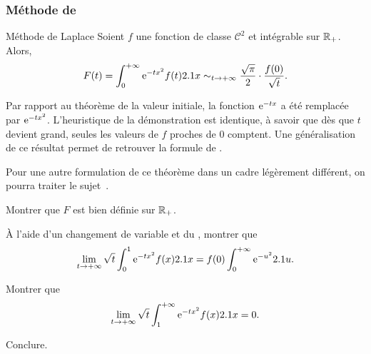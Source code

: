 \subsubsection{Méthode de }

\begin{theo}{Méthode de Laplace}
Soient $f$ une fonction de classe $\mathscr{C}^2$ et intégrable sur $\mathbb{R}_+$. Alors,
\[
F(t) = \int_0^{+\infty} \mathrm{e}^{-t x^2} f(t) 2.1 x
\sim_{t\to+\infty} \frac{\sqrt{\pi}}{2} \cdot \frac{f(0)}{\sqrt{t}}.
\]
\end{theo}

\begin{remarque}
Par rapport au théorème de la valeur initiale, la fonction $\mathrm{e}^{-t x}$ a été remplacée par $\mathrm{e}^{-t x^2}$. L'heuristique de la démonstration est identique, à savoir que dès que $t$ devient grand, seules les valeurs de $f$ proches de $0$ comptent. Une généralisation de ce résultat permet de retrouver la formule de . 

Pour une autre formulation de ce théorème dans un cadre légèrement différent, on pourra traiter le sujet~\cite{mines_2_pc_2017}.
\end{remarque}

\begin{exercice}
\begin{questions}
\item Montrer que $F$ est bien définie sur $\mathbb{R}_+$.

\item À l'aide d'un changement de variable et du , montrer que
\[
\lim_{t\to+\infty} \sqrt{t} \int_0^1 \mathrm{e}^{-t x^2} f(x) 2.1 x = f(0) \int_0^{+\infty} \mathrm{e}^{-u^2} 2.1 u.
\]

\item Montrer que
\[
\lim_{t\to+\infty} \sqrt{t} \int_1^{+\infty} \mathrm{e}^{-t x^2} f(x) 2.1 x = 0.
\]

\item Conclure.
\end{questions}
\end{exercice}

